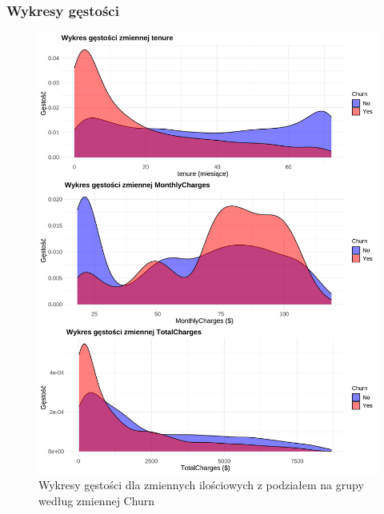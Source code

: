 \documentclass[12pt, a4paper]{article}\usepackage[]{graphicx}\usepackage[]{xcolor}
\makeatletter
\def\maxwidth{ %
  \ifdim\Gin@nat@width>\linewidth
    \linewidth
  \else
    \Gin@nat@width
  \fi
}
\newenvironment{knitrout}{}{} %
\makeatother
\begin{document}
\subsubsection{Wykresy gęstości}
\begin{knitrout}
\color{fgcolor}\begin{figure}[H]

{\centering \includegraphics[width=\maxwidth]{figure/gestosc-churn-1} 

}

\caption[Wykresy gęstości dla zmiennych ilościowych z podziałem na grupy według zmiennej Churn]{Wykresy gęstości dla zmiennych ilościowych z podziałem na grupy według zmiennej Churn}\label{fig:gestosc-churn}
\end{figure}

\end{knitrout}
\end{document}
